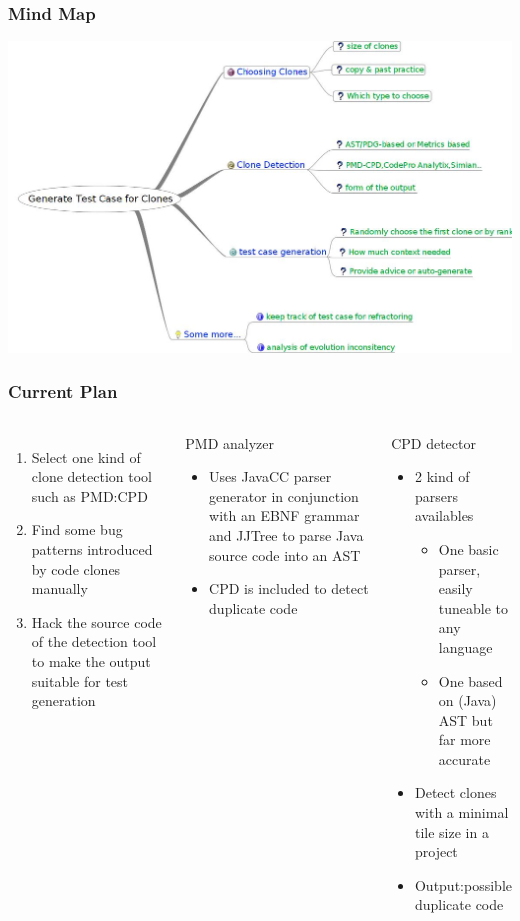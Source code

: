 \documentclass[pdf]{beamer}
\begin{document}
\begin{frame}
\frametitle{Mind Map}
\begin{center}
\includegraphics[width=.9\textwidth]{Generate_Test_Case_for_Clones.jpeg}
\end{center}
\end{frame}

\begin{frame}
\frametitle{Current Plan}
\begin{columns}
\begin{enumerate}
  \item Select one kind of clone detection tool such as PMD:CPD
  \vskip11pt
  \item Find some bug patterns introduced by code clones manually 
    \vskip11pt
  \item Hack the source code of the detection tool to make the output
  suitable for test generation
\end{enumerate}
\footnotesize
{
\begin{block}{PMD analyzer}
\begin{itemize}
  \item Uses JavaCC parser generator in conjunction with an EBNF grammar and JJTree
  to parse Java source code into an AST
  \item CPD is included to detect duplicate code
\end{itemize}
\end{block}
\begin{block}{CPD detector}
\begin{itemize}
  \item 2 kind of parsers availables
  \begin{itemize}
    \item One basic parser, easily tuneable to any language
    \item One based on (Java) AST but far more accurate
    \end{itemize}
  \item Detect clones with a minimal tile size in a project
  \item Output:possible duplicate code
\end{itemize}
\end{block}
}
\end{columns}
\end{frame}
\end{document}
